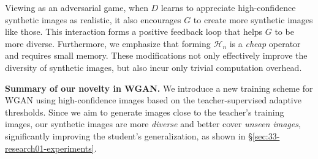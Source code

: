 \begin{foldable}
  Viewing as an adversarial game, when $D$ learns to appreciate high-confidence synthetic images as realistic, it also encourages $G$ to create more synthetic images like those.
  This interaction forms a positive feedback loop that helps $G$ to be more diverse.
  Furthermore, we emphasize that forming $\mathcal{H}_{n}$ is a \textit{cheap} operator and requires small memory.
  These modifications not only effectively improve the diversity of synthetic images, but also incur only trivial computation overhead.
\end{foldable}

\begin{foldable}
  \textbf{Summary of our novelty in WGAN.}
  We introduce a new training scheme for WGAN using high-confidence images based on the teacher-supervised adaptive thresholds.
  Since we aim to generate images close to the teacher's training images, our synthetic images are more \textit{diverse} and better cover \textit{unseen images}, significantly improving the student's generalization, as shown in \S\ref{sec:33-research01-experiments}.
\end{foldable}

